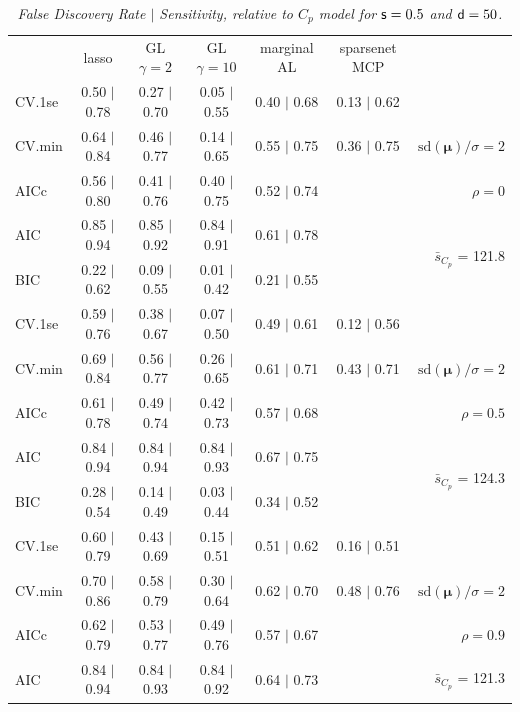 \documentclass[12pt]{article}
\newcommand{\mr}[1]{\mathrm{#1}}
\newcommand{\bm}[1]{\mathbf{#1}}
\begin{document}
\begin{table}[p]\vspace{-.5cm}
\caption[l]{\it False Discovery Rate $\mid$ Sensitivity, relative to $C_p$ model  for ${\sf s}=0.5$ and ${\sf d}=50$.}
\vspace{-.5cm}
\small{}
\begin{center}
\begin{tabular}{l*{5}{c}|r}
 & lasso & GL $\gamma=2$ & GL $\gamma=10$ & marginal AL & sparsenet MCP  & \\
 \cline{1-7}
CV.1se & 0.50 $\mid$ 0.78 & 0.27 $\mid$ 0.70 & 0.05 $\mid$ 0.55 & 0.40 $\mid$ 0.68 & 0.13 $\mid$ 0.62 &\\
CV.min & 0.64 $\mid$ 0.84 & 0.46 $\mid$ 0.77 & 0.14 $\mid$ 0.65 & 0.55 $\mid$ 0.75 & 0.36 $\mid$ 0.75 &  $\mr{sd}(\bm{\mu})/\sigma=2$ \\
AICc & 0.56 $\mid$ 0.80 & 0.41 $\mid$ 0.76 & 0.40 $\mid$ 0.75 & 0.52 $\mid$ 0.74 & & $\rho=0$ \\
AIC & 0.85 $\mid$ 0.94 & 0.85 $\mid$ 0.92 & 0.84 $\mid$ 0.91 & 0.61 $\mid$ 0.78 & & \multirow{2}{*}{$\bar{s}_{C_p}$ = 121.8} \\
BIC & 0.22 $\mid$ 0.62 & 0.09 $\mid$ 0.55 & 0.01 $\mid$ 0.42 & 0.21 $\mid$ 0.55 & & \\
 \hline 
CV.1se & 0.59 $\mid$ 0.76 & 0.38 $\mid$ 0.67 & 0.07 $\mid$ 0.50 & 0.49 $\mid$ 0.61 & 0.12 $\mid$ 0.56 &\\
CV.min & 0.69 $\mid$ 0.84 & 0.56 $\mid$ 0.77 & 0.26 $\mid$ 0.65 & 0.61 $\mid$ 0.71 & 0.43 $\mid$ 0.71 &  $\mr{sd}(\bm{\mu})/\sigma=2$ \\
AICc & 0.61 $\mid$ 0.78 & 0.49 $\mid$ 0.74 & 0.42 $\mid$ 0.73 & 0.57 $\mid$ 0.68 & & $\rho=0.5$ \\
AIC & 0.84 $\mid$ 0.94 & 0.84 $\mid$ 0.94 & 0.84 $\mid$ 0.93 & 0.67 $\mid$ 0.75 & & \multirow{2}{*}{$\bar{s}_{C_p}$ = 124.3} \\
BIC & 0.28 $\mid$ 0.54 & 0.14 $\mid$ 0.49 & 0.03 $\mid$ 0.44 & 0.34 $\mid$ 0.52 & & \\
 \hline 
CV.1se & 0.60 $\mid$ 0.79 & 0.43 $\mid$ 0.69 & 0.15 $\mid$ 0.51 & 0.51 $\mid$ 0.62 & 0.16 $\mid$ 0.51 &\\
CV.min & 0.70 $\mid$ 0.86 & 0.58 $\mid$ 0.79 & 0.30 $\mid$ 0.64 & 0.62 $\mid$ 0.70 & 0.48 $\mid$ 0.76 &  $\mr{sd}(\bm{\mu})/\sigma=2$ \\
AICc & 0.62 $\mid$ 0.79 & 0.53 $\mid$ 0.77 & 0.49 $\mid$ 0.76 & 0.57 $\mid$ 0.67 & & $\rho=0.9$ \\
AIC & 0.84 $\mid$ 0.94 & 0.84 $\mid$ 0.93 & 0.84 $\mid$ 0.92 & 0.64 $\mid$ 0.73 & & \multirow{2}{*}{$\bar{s}_{C_p}$ = 121.3} \\

\end{tabular}
\end{center}
\end{table}
\end{document}
